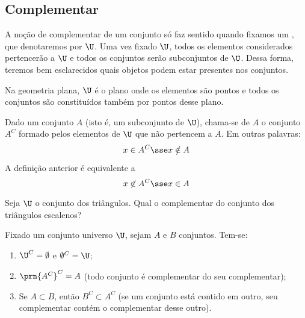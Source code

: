 \subsection{Complementar}
A noção de complementar de um conjunto só faz sentido quando fixamos um , que denotaremos por $\U$.
Uma vez fixado $\U$, todos os elementos considerados pertencerão a $\U$ e todos os conjuntos serão subconjuntos de $\U$.
Dessa forma, teremos bem esclarecidos quais objetos podem estar presentes nos conjuntos.

\begin{example}
Na geometria plana, $\U$ é o plano onde os elementos são pontos e todos os conjuntos são constituídos também por pontos desse plano.
\end{example}

\begin{definition}[Complementar]
\label{def:complementar}
Dado um conjunto $A$ (isto é, um subconjunto de $\U$), chama-se  de $A$ o conjunto $A^C$ formado pelos elementos de $\U$ que não pertencem a $A$.
Em outras palavras:
$$
x \in A^C \sse x \notin A
$$
\end{definition}

\begin{remark}
\label{obs:def-complementar}
A definição anterior é equivalente a
$$
x \not \in A^C \sse x \in A
$$
\end{remark}

\begin{example}
Seja $\U$ o conjunto dos triângulos.
Qual o complementar do conjunto dos triângulos escalenos?
\end{example}

\begin{proposition}
\label{prop-complementar}
Fixado um conjunto universo $\U$, sejam $A$ e $B$ conjuntos.
Tem-se:
%
\begin{enumerate}
	\item $\U^C=\emptyset$ e $\emptyset^C = \U$;
	\item $\prn{A^C}^C=A$ (todo conjunto é complementar do seu complementar);
	\item Se $A \subset B$, então $B^C \subset A^C$ (se um conjunto está contido em outro, seu complementar contém o complementar desse outro). 
\end{enumerate}
\end{proposition}

